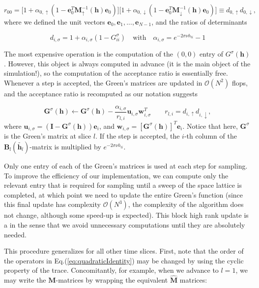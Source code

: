 \begin{equation}
r_{0 0} = \bigg[ 1 + \alpha_{0, \uparrow} ( 1 - \bm e_0^T \bm M_\uparrow^{-1} ( \bm h ) \bm e_0 ) \bigg] \bigg[ 1 + \alpha_{0, \downarrow} ( 1 - \bm e_0^T \bm M_\downarrow^{-1} ( \bm h ) \bm e_0 ) \bigg] \equiv d_{0, \uparrow} d_{0, \downarrow} ,
\end{equation}
where we defined the unit vectors $\bm e_0, \bm e_1, ..., \bm e_{N-1}$, and the ratios of determinants

\begin{equation*}
d_{i, \sigma} = 1 + \alpha_{i, \sigma} ( 1 - G^\sigma_{i i} ) \quad \text{with} \quad \alpha_{i, \sigma} = e^{-2 \sigma \nu h_{l i}} - 1
\end{equation*}

The most expensive operation is the computation of the $(0, 0)$ entry of $G^\sigma (\bm h)$.
However, this object is always computed in advance (it is the main object of the simulation!), so the computation of the acceptance ratio is essentially free.
Whenever a step is accepted, the Green's matrices are updated in $\mathcal{O}(N^2)$ flops, and the acceptance ratio is recomputed as our notation suggests

\begin{equation}\label{eq:updates}
\bm G^\sigma ( \bm h ) \leftarrow \bm G^\sigma ( \bm h ) - \frac{\alpha_{i, \sigma}}{r_{l, i}} \bm u_{i, \sigma} \bm w_{i, \sigma}^T \quad \quad r_{l,i} = d_{i, \uparrow} d_{i, \downarrow} ,
\end{equation}
where $\bm u_{i, \sigma} = ( \bm I - \bm G^\sigma ( \bm h ) ) \bm e_i$, and $\bm w_{i, \sigma} = [ \bm G^\sigma (\bm h) ]^T \bm e_i$.
Notice that here, $\bm G^\sigma$ is the Green's matrix at slice $l$.
If the step is accepted, the $i$-th column of the $\bm B_l ( \widetilde{\bm h_l} )$-matrix is multiplied by $e^{-2 \sigma \nu h_{l i}}$.

Only one entry of each of the Green's matrices is used at each step for sampling.
To improve the efficiency of our implementation, we can compute only the relevant entry that is required for sampling until a sweep of the space lattice is completed, at which point we need to update the entire Green's function (since this final update has complexity $\mathcal{O}(N^3)$, the complexity of the algorithm does not change, although some speed-up is expected).
This block high rank update is a   in the sense that we avoid unnecessary computations until they are absolutely needed.

This procedure generalizes for all other time slices.
First, note that the order of the operators in Eq.(\ref{eq:quadraticIdentity}) may be changed by using the cyclic property of the trace.
Concomitantly, for example, when we advance to $l = 1$, we may write the $\bm M$-matrices by wrapping the equivalent $\widehat{\bm M}$ matrices:

